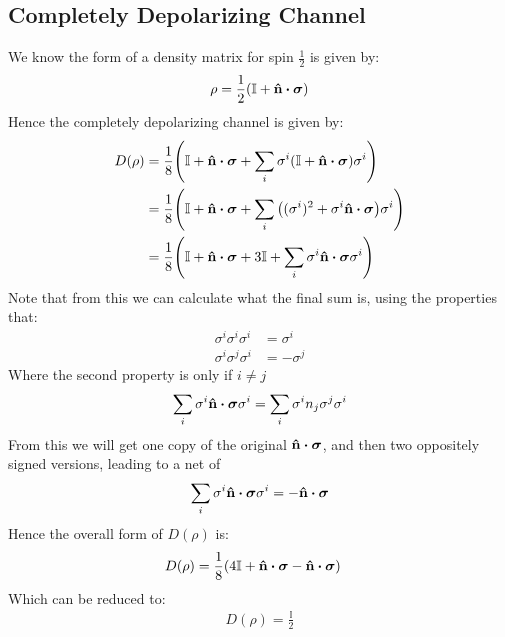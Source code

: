\documentclass[12pt]{article}
\begin{document}
\subsection{Completely Depolarizing Channel}
We know the form of a density matrix for spin $\frac12$ is given by:
\begin{align*}
  \rho=\frac12\qty(\mathbb{I}+\vu{n}\vdot\bm\sigma)
\end{align*}
Hence the completely depolarizing channel is given by:
\begin{align*}
  D(\rho)&=\frac18\qty(\mathbb{I}+\vu{n}\vdot\bm\sigma+
  \sum_i\sigma^i\qty(\mathbb{I}+\vu{n}\vdot\bm\sigma)\sigma^i)\\
  &=\frac18\qty(\mathbb{I}+\vu{n}\vdot\bm\sigma+
  \sum_i\qty((\sigma^i)^2+\sigma^i\vu{n}\vdot\bm\sigma)\sigma^i)\\
  &=\frac18\qty(\mathbb{I}+\vu{n}\vdot\bm\sigma+3\mathbb{I}+
  \sum_i\sigma^i\vu{n}\vdot\bm\sigma\sigma^i)
\end{align*}
Note that from this we can calculate what the final sum is, using the properties that:
\begin{align*}
  \sigma^i\sigma^i\sigma^i&=\sigma^i\\
  \sigma^i\sigma^j\sigma^i&=-\sigma^j
\end{align*}
Where the second property is only if $i\neq j$
\begin{align*}
  \sum_i\sigma^i\vu{n}\vdot\bm\sigma\sigma^i=
  \sum_i\sigma^in_j\sigma^j\sigma^i
\end{align*}
From this we will get one copy of the original $\vu{n}\vdot\bm\sigma$, and then two oppositely signed versions, leading to a net of
\begin{align*}
  \sum_i\sigma^i\vu{n}\vdot\bm\sigma\sigma^i=-\vu{n}\vdot\bm\sigma
\end{align*}
Hence the overall form of $D(\rho)$ is:
\begin{align*}
  D(\rho)&=\frac18\qty(4\mathbb{I}+\vu{n}\vdot\bm\sigma-\vu{n}\vdot\bm\sigma)
\end{align*}
Which can be reduced to:
\begin{align*}
  \boxed{D(\rho)=\frac{\mathbb{I}}{2}}
\end{align*}
\end{document}
